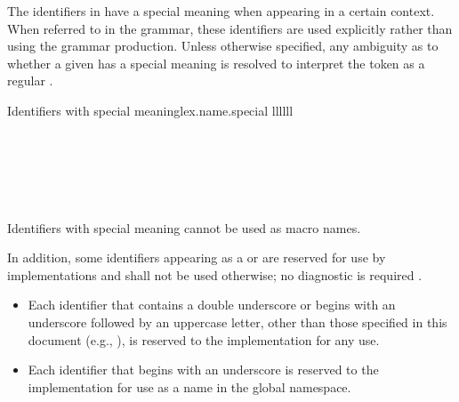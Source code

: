 \pnum
{}%
%
%
%
The identifiers in  have a special meaning when
appearing in a certain context. When referred to in the grammar, these identifiers
are used explicitly rather than using the  grammar production.
Unless otherwise specified, any ambiguity as to whether a given
 has a special meaning is resolved to interpret the
token as a regular .

\begin{multicolfloattable}{Identifiers with special meaning}{lex.name.special}
{llllll}
           \\
\columnbreak
{}          \\
\columnbreak
{}          \\
\columnbreak
{}        \\
\columnbreak
{}            \\
\columnbreak
{}             \\
\end{multicolfloattable}

\pnum
\begin{note}
Identifiers with special meaning
cannot be used as macro names.
\end{note}

\pnum
{}%
%
%
In addition, some identifiers
appearing as a  or 
are reserved for use by \Cpp{}
implementations and shall
not be used otherwise; no diagnostic is required .
\begin{itemize}
\item
Each identifier that contains a double underscore
\tcode{\unun}
%
or begins with an underscore followed by
an uppercase letter,
other than those specified in this document
(e.g., ),
%
is reserved to the implementation for any use.
\item
Each identifier that begins with an underscore is
%
reserved to the implementation for use as a name in the global namespace.%
\end{itemize}%

